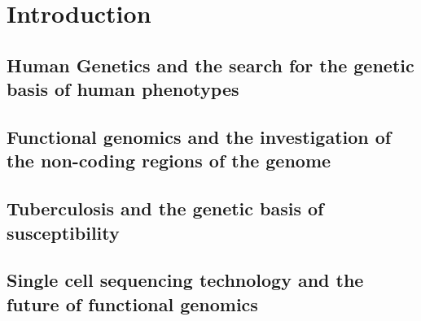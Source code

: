\chapter{Introduction}

\section{Human Genetics and the search for the genetic basis of human phenotypes}

\section{Functional genomics and the investigation of the non-coding regions of the genome}

\section{Tuberculosis and the genetic basis of susceptibility}
\section{Single cell sequencing technology and the future of functional genomics}
